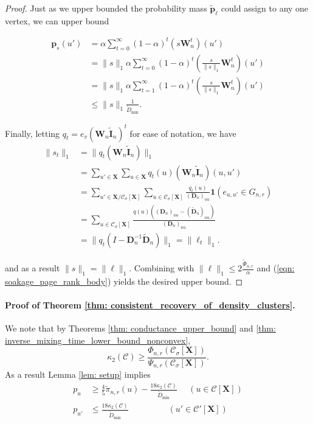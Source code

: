 \documentclass{article}
\newcommand{\1}{\mathbf{1}}
\newcommand{\pbf}{\mathbf{p}}
\newcommand{\Xbf}{\mathbf{X}}
\newcommand{\Wbf}{\mathbf{W}}
\newcommand{\Dbf}{\mathbf{D}}
\newcommand{\Cset}{\mathcal{C}}
\newcommand{\Csig}{\Cset_{\sigma}}
\theoremstyle{aldenthm}
\begin{document}
\begin{proof}
	Just as we upper bounded the probability mass $\widetilde{\pbf}_{\ell}$ could assign to any one vertex, we can upper bound 
	
	\begin{align} \label{eqn: soakage_page_rank_body}
	\pbf_{s}(u') & = \alpha \sum_{t = 0}^{\infty} (1 - \alpha)^t \left(s \Wbf_n^t \right)(u') \nonumber \\
	& = \|s\|_1 \alpha \sum_{t = 0}^{\infty} (1 - \alpha)^t \left(\frac{s}{\|s\|_1} {\Wbf}_n^t \right)(u')\nonumber \\
	& = \|s\|_1 \alpha \sum_{t = 1}^{\infty} (1 - \alpha)^t \left(\frac{s}{\|s\|_1}  {\Wbf}_n^t \right)(u')\nonumber \\
	& \leq \|s\|_1 \frac{1}{\widetilde{D}_{\min}}.
	\end{align}
	
	Finally, letting $q_t = e_v (\Wbf_n \widetilde{\mathbf{I}}_n)^t$ for ease of notation, we have
	\begin{align*}
	\|s_t\|_1 & = \|q_t (\Wbf_n \widetilde{\mathbf{I}}_n)\|_1 \\
	& = \sum_{u' \in \Xbf} \sum_{u \in \Xbf} q_t(u) (\Wbf_n \widetilde{\mathbf{I}}_n)(u, u')\\
	& = \sum_{u' \in \Xbf / \Csig[\Xbf]} \sum_{u \in \Csig[\Xbf]} \frac{q_t(u)}{(\Dbf_n)_{uu}} \1(e_{u,u'} \in G_{n,r}) \\
	& = \sum_{u \in \Csig[\Xbf]} \frac{q(u) \left((\Dbf_n)_{uu} - (\widetilde{\Dbf}_n)_{uu} \right)}{(\Dbf_n)_{uu}} \\
	& = \|q_t (I - \Dbf_n^{-1} \widetilde{\Dbf}_n)\|_1 = \|\ell_t\|_1.
	\end{align*}
	
	and as a result $\|s\|_1 = \|\ell\|_1$. Combining with $\|\ell\|_1 \leq 2 \frac{\widetilde{\Phi}_{n,r}}{\alpha}$ and (\ref{eqn: soakage_page_rank_body}) yields the desired upper bound.
\end{proof}

\paragraph{Proof of Theorem \ref{thm: consistent_recovery_of_density_clusters}.}

We note that by Theorems \ref{thm: conductance_upper_bound} and \ref{thm: inverse_mixing_time_lower_bound_nonconvex}, 
\begin{equation*}
\kappa_2(\Cset) \geq \frac{\Phi_{n,r}(\Csig[\Xbf])}{\Psi_{n,r}(\Csig[\Xbf])}.
\end{equation*}
As a result Lemma \ref{lem: setup} implies
\begin{align}
\label{eqn: theorem_4_1}
p_u & \geq \frac{4}{5} \widetilde{\pi}_{n,r}(u) - \frac{18 \kappa_2(\Cset)}{\widetilde{D}_{\min}} ~~~~~~ (u \in \Cset[\Xbf]) \nonumber \\
p_{u'} & \leq \frac{18 \kappa_2(\Cset)}{\widetilde{D}_{\min}} ~~~~~~~~~~~~~~~~~~~~~ (u' \in \Cset'[\Xbf])
\end{align}
\end{document}
